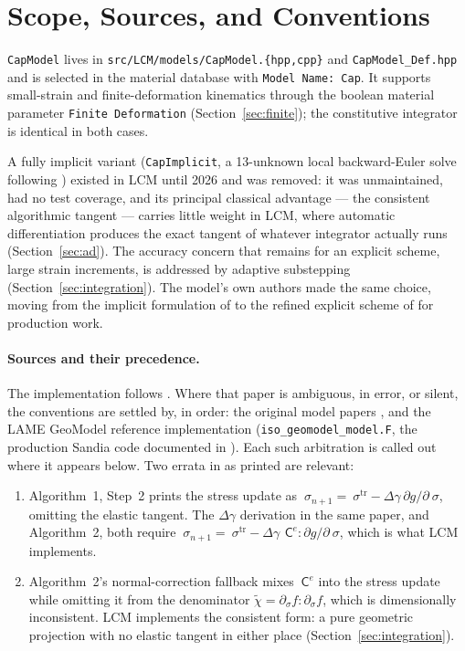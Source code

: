 \documentclass[12pt]{article}
\newcommand{\stress}{~\sigma}
\newcommand{\Celast}{{~{\mathsf C}^e}}
\begin{document}
\section{Scope, Sources, and Conventions}
\label{sec:scope}

\texttt{CapModel} lives in
\texttt{src/LCM/models/CapModel.\{hpp,cpp\}} and
\texttt{CapModel\_Def.hpp} and is selected in the material database
with \texttt{Model Name: Cap}. It supports small-strain and
finite-deformation kinematics through the boolean material parameter
\texttt{Finite Deformation} (Section~\ref{sec:finite}); the
constitutive integrator is identical in both cases.

A fully implicit variant (\texttt{CapImplicit}, a 13-unknown local
backward-Euler solve following \citealt{Foster.etal:2005}) existed in
LCM until 2026 and was removed: it was unmaintained, had no test
coverage, and its principal classical advantage --- the consistent
algorithmic tangent --- carries little weight in LCM, where automatic
differentiation produces the exact tangent of whatever integrator
actually runs (Section~\ref{sec:ad}). The accuracy concern that
remains for an explicit scheme, large strain increments, is addressed
by adaptive substepping (Section~\ref{sec:integration}). The model's
own authors made the same choice, moving from the implicit
formulation of \citet{Foster.etal:2005} to the refined explicit
scheme of \citet{Sun.Chen.Ostien:2014} for production work.

\paragraph{Sources and their precedence.}
The implementation follows
\citet[Section~3]{Sun.Chen.Ostien:2014}. Where that paper is
ambiguous, in error, or silent, the conventions are settled by, in
order: the original model papers
\citep{Foster.etal:2005,Regueiro.Foster:2011}, and the LAME GeoModel
reference implementation (\texttt{iso\_geomodel\_model.F}, the
production Sandia code documented in \citealt{Fossum.Brannon:2004}).
Each such arbitration is called out where it appears below. Two
errata in \citet{Sun.Chen.Ostien:2014} as printed are relevant:
\begin{enumerate}
\item Algorithm~1, Step~2 prints the stress update as
      $\stress_{n+1} = \stress^{\mathrm{tr}}
       - \Delta\gamma\,\partial g/\partial\stress$, omitting the
      elastic tangent. The $\Delta\gamma$ derivation in the same
      paper, and Algorithm~2, both require
      $\stress_{n+1} = \stress^{\mathrm{tr}}
       - \Delta\gamma\,\Celast\!:\!\partial g/\partial\stress$,
      which is what LCM implements.
\item Algorithm~2's normal-correction fallback mixes $\Celast$ into
      the stress update while omitting it from the denominator
      $\tilde\chi = \partial_\sigma f : \partial_\sigma f$, which is
      dimensionally inconsistent. LCM implements the consistent
      \citet{Sloan.Abbo.Sheng:2001} form: a pure geometric projection
      with no elastic tangent in either place
      (Section~\ref{sec:integration}).
\end{enumerate}
\end{document}
